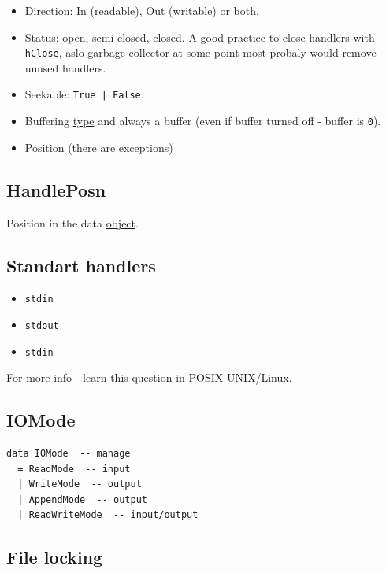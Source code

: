 \documentclass[a4paper,14pt,oneside]{book}
\begin{document}
\begin{itemize}
\item Direction: In (readable), Out (writable) or both.
\item Status: open, semi-\hyperref[org55dc967]{closed}, \hyperref[org55dc967]{closed}.
A good practice to close handlers with \texttt{hClose}, aslo garbage collector at some point most probaly would remove unused handlers.
\item Seekable: \texttt{True | False}.
\item Buffering \hyperref[orge4c0722]{type} and always a buffer (even if buffer turned off - buffer is \texttt{0}).
\item Position (there are \hyperref[org4a1b6e5]{exceptions})
\end{itemize}

\subsection{HandlePosn}
\label{sec:org68b33b7}

Position in the data \hyperref[orgcfdb5f4]{object}.

\subsection{Standart handlers}
\label{sec:org077ff38}

\begin{itemize}
\item \texttt{stdin}
\item \texttt{stdout}
\item \texttt{stdin}
\end{itemize}

For more info - learn this question in POSIX UNIX/Linux.

\subsection{IOMode}
\label{sec:orga4671ba}

\begin{verbatim}
data IOMode  -- manage
  = ReadMode  -- input
  | WriteMode  -- output
  | AppendMode  -- output
  | ReadWriteMode  -- input/output
\end{verbatim}

\subsection{File locking}
\label{sec:orgff15ad8}
\end{document}
